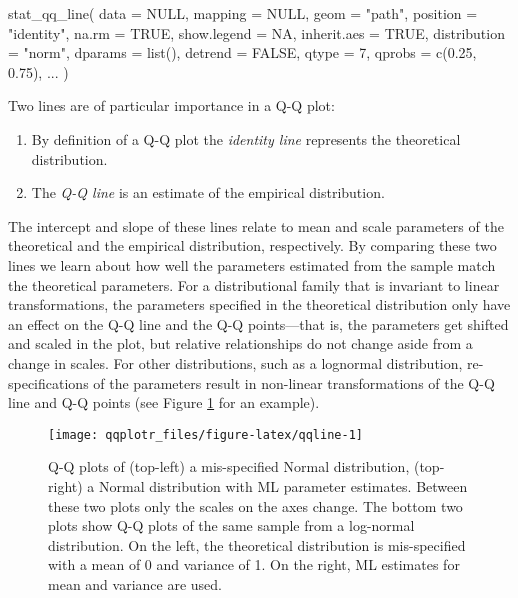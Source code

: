 \begin{Schunk}
\begin{Sinput}
stat_qq_line(
  data = NULL,
  mapping = NULL,
  geom = "path",
  position = "identity",
  na.rm = TRUE,
  show.legend = NA,
  inherit.aes = TRUE,
  distribution = "norm",
  dparams = list(),
  detrend = FALSE,
  qtype = 7,
  qprobs = c(0.25, 0.75),
  ...
  )
\end{Sinput}
\end{Schunk}

Two lines are of particular importance in a Q-Q plot:

\begin{enumerate}
\def\labelenumi{\alph{enumi})}
\tightlist
\item
  By definition of a Q-Q plot the \emph{identity line} represents the
  theoretical distribution.
\item
  The \emph{Q-Q line} is an estimate of the empirical distribution.
\end{enumerate}

The intercept and slope of these lines relate to mean and scale
parameters of the theoretical and the empirical distribution,
respectively. By comparing these two lines we learn about how well the
parameters estimated from the sample match the theoretical parameters.
For a distributional family that is invariant to linear transformations,
the parameters specified in the theoretical distribution only have an
effect on the Q-Q line and the Q-Q points---that is, the parameters get
shifted and scaled in the plot, but relative relationships do not change
aside from a change in scales. For other distributions, such as a
lognormal distribution, re-specifications of the parameters result in
non-linear transformations of the Q-Q line and Q-Q points (see Figure
\ref{fig:qqline} for an example).

\begin{Schunk}
\begin{figure}
\texttt{[image: qqplotr\_files/figure-latex/qqline-1]} \caption[Q-Q plots of (top-left) a mis-specified Normal distribution, (top-right)  a Normal distribution with ML parameter estimates]{Q-Q plots of (top-left) a mis-specified Normal distribution, (top-right)  a Normal distribution with ML parameter estimates. Between these two plots only the scales on the axes change. The bottom two plots show Q-Q plots of the same sample from a log-normal distribution. On the left, the theoretical distribution is mis-specified with a mean of 0 and variance of 1. On the right, ML estimates for mean and variance are used.}\label{fig:qqline}
\end{figure}
\end{Schunk}

